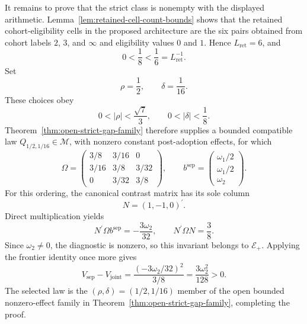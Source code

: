 It remains to prove that the strict class is nonempty with the displayed arithmetic. Lemma~\ref{lem:retained-cell-count-bounds} shows that the retained cohort-eligibility cells in the proposed architecture are the six pairs obtained from cohort labels \(2\), \(3\), and \(\infty\) and eligibility values \(0\) and \(1\). Hence \(L_{\mathrm{ret}}=6\), and
\[
 0<\frac18<\frac16=L_{\mathrm{ret}}^{-1}.
\]
Set
\[
 \rho=\frac12,
 \qquad
 \delta=\frac1{16}.
\]
These choices obey
\[
 0<|\rho|<\frac{\sqrt7}{3},
 \qquad
 0<|\delta|<\frac18.
\]
Theorem~\ref{thm:open-strict-gap-family} therefore supplies a bounded compatible law \(Q_{1/2,1/16}\in\mathcal M\), with nonzero constant post-adoption effects, for which
\[
 \Omega=
 \begin{pmatrix}
 3/8&3/16&0\\
 3/16&3/8&3/32\\
 0&3/32&3/8
 \end{pmatrix},
 \qquad
 b^{\mathrm{sep}}=
 \begin{pmatrix}
 \omega_1/2\\
 \omega_1/2\\
 \omega_2
 \end{pmatrix}.
\]
For this ordering, the canonical contrast matrix has its sole column
\[
 N=(1,-1,0)^{\prime}.
\]
Direct multiplication yields
\[
 N^{\prime}\Omega b^{\mathrm{sep}}=-\frac{3\omega_2}{32},
 \qquad
 N^{\prime}\Omega N=\frac38.
\]
Since \(\omega_2\ne0\), the diagnostic is nonzero, so this invariant belongs to \(\mathscr E_+\). Applying the frontier identity once more gives
\[
 V_{\mathrm{sep}}-V_{\mathrm{joint}}
 =\frac{(-3\omega_2/32)^2}{3/8}
 =\frac{3\omega_2^2}{128}>0.
\]
The selected law is the \((\rho,\delta)=(1/2,1/16)\) member of the open bounded nonzero-effect family in Theorem~\ref{thm:open-strict-gap-family}, completing the proof.